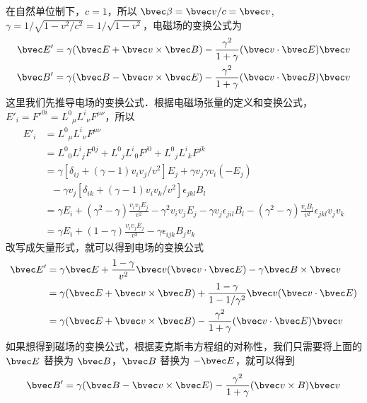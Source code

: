 在自然单位制下，$c=1$，所以 $\bvec \beta=\bvec v/c=\bvec v$,$\gamma=1/\sqrt{1-v^2/c^2}=1/\sqrt{1-v^2}$，电磁场的变换公式为
\begin{equation}
\begin{aligned}
\bvec E'=\gamma(\bvec E+\bvec v\times \bvec B)-\frac{\gamma^2}{1+\gamma}(\bvec v \cdot \bvec E)\bvec v\\
\bvec B'=\gamma(\bvec B-\bvec v\times \bvec E)-\frac{\gamma^2}{1+\gamma}(\bvec v \cdot \bvec B)\bvec v
\end{aligned}
\end{equation}
这里我们先推导电场的变换公式．根据电磁场张量的定义和变换公式， $E'_i=F'^{0i}={L^0}_\mu {L^i}_{\nu} F^{\mu\nu}$，所以
\begin{equation}
\begin{aligned}
E'_i&={L^0}_\mu {L^i}_\nu F^{\mu\nu}\\
&={L^0}_0 {L^i}_j F^{0j}+{L^0}_j {L^i}_0 F^{j0} + {L^0}_j {L^i}_k F^{jk} \\
&=\gamma[\delta_{ij}+(\gamma-1) v_iv_j/v^2]E_j+\gamma v_j\gamma v_i  (-E_j)\\
&\ \ \ -\gamma v_j [\delta_{ik}+(\gamma-1)v_i v_k/v^2]\epsilon_{jkl}B_l\\
&=\gamma E_i+(\gamma^2-\gamma)\frac{v_iv_jE_j}{v^2}-\gamma^2v_iv_jE_j-\gamma v_j\epsilon_{jil}B_l -(\gamma^2-\gamma)\frac{v_iB_l}{v^2}\epsilon_{jkl}v_jv_k \\
&=\gamma E_i+(1-\gamma)\frac{v_iv_jE_j}{v^2}-\gamma\epsilon_{ijk}B_jv_k
\end{aligned}
\end{equation}
改写成矢量形式，就可以得到电场的变换公式
\begin{equation}
\begin{aligned}
\bvec E'&=\gamma\bvec E+\frac{1-\gamma}{v^2}\bvec v(\bvec v\cdot \bvec E)-\gamma \bvec B\times \bvec v\\
&=\gamma(\bvec E+\bvec v\times \bvec B)+\frac{1-\gamma}{1-1/\gamma^2}\bvec v(\bvec v \cdot \bvec E)\\
&=\gamma(\bvec E+\bvec v\times \bvec B)-\frac{\gamma^2}{1+\gamma}(\bvec v\cdot \bvec E)\bvec v
\end{aligned} 
\end{equation}
如果想得到磁场的变换公式，根据麦克斯韦方程组的对称性，我们只需要将上面的 $\bvec E$ 替换为 $\bvec B$，$\bvec B$ 替换为 $-\bvec E$，就可以得到
\begin{equation}
\bvec B'=\gamma (\bvec B-\bvec v\times \bvec E)-\frac{\gamma^2}{1+\gamma}(\bvec v\times B)\bvec v
\end{equation}

